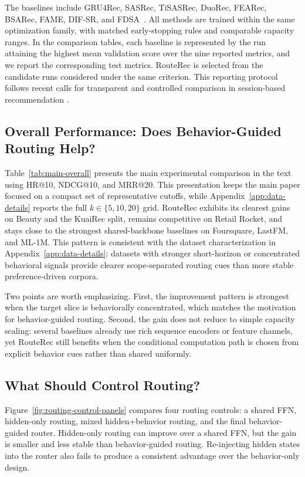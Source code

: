 \documentclass[sigconf,review,anonymous]{acmart}
\begin{document}
The baselines include GRU4Rec, SASRec, TiSASRec, DuoRec, FEARec, BSARec, FAME, DIF-SR, and FDSA~\cite{hidasi2016gru4rec,kang2018sasrec,li2020tisasrec,qiu2022duorec,du2023fearec,shin2024bsarec,liu2025fame,xie2022difsr,zhang2019fdsa}. All methods are trained within the same optimization family, with matched early-stopping rules and comparable capacity ranges. In the comparison tables, each baseline is represented by the run attaining the highest mean validation score over the nine reported metrics, and we report the corresponding test metrics. RouteRec is selected from the candidate runs considered under the same criterion. This reporting protocol follows recent calls for transparent and controlled comparison in session-based recommendation \cite{ludewig2021empirical}.

\subsection{Overall Performance: Does Behavior-Guided Routing Help?}
\label{sec:overall-performance}
Table~\ref{tab:main-overall} presents the main experimental comparison in the text using HR@10, NDCG@10, and MRR@20. This presentation keeps the main paper focused on a compact set of representative cutoffs, while Appendix~\ref{app:data-details} reports the full $k\in\{5,10,20\}$ grid. RouteRec exhibits its clearest gains on Beauty and the KuaiRec split, remains competitive on Retail Rocket, and stays close to the strongest shared-backbone baselines on Foursquare, LastFM, and ML-1M. This pattern is consistent with the dataset characterization in Appendix~\ref{app:data-details}: datasets with stronger short-horizon or concentrated behavioral signals provide clearer scope-separated routing cues than more stable preference-driven corpora.

Two points are worth emphasizing. First, the improvement pattern is strongest when the target slice is behaviorally concentrated, which matches the motivation for behavior-guided routing. Second, the gain does not reduce to simple capacity scaling: several baselines already use rich sequence encoders or feature channels, yet RouteRec still benefits when the conditional computation path is chosen from explicit behavior cues rather than shared uniformly.

\subsection{What Should Control Routing?}
\label{sec:routing-control}
Figure~\ref{fig:routing-control-panels} compares four routing controls: a shared FFN, hidden-only routing, mixed hidden+behavior routing, and the final behavior-guided router. Hidden-only routing can improve over a shared FFN, but the gain is smaller and less stable than behavior-guided routing. Re-injecting hidden states into the router also fails to produce a consistent advantage over the behavior-only design.
\end{document}
